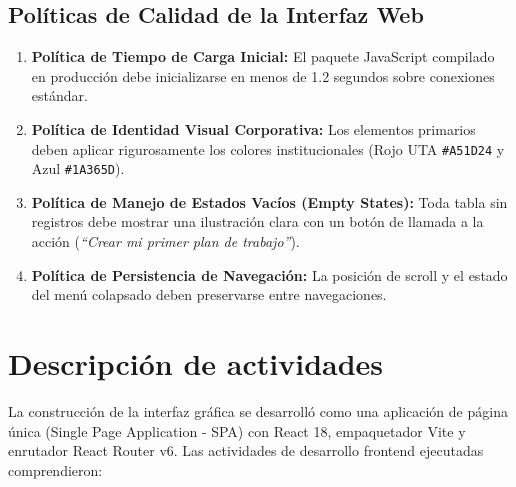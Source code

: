 \documentclass[12pt,a4paper]{article}
\begin{document}
\subsection{Políticas de Calidad de la Interfaz Web}
\begin{enumerate}[leftmargin=1.5em, itemsep=2pt]
    \item \textbf{Política de Tiempo de Carga Inicial:} El paquete JavaScript compilado en producción debe inicializarse en menos de 1.2 segundos sobre conexiones estándar.
    \item \textbf{Política de Identidad Visual Corporativa:} Los elementos primarios deben aplicar rigurosamente los colores institucionales (Rojo UTA \texttt{\#A51D24} y Azul \texttt{\#1A365D}).
    \item \textbf{Política de Manejo de Estados Vacíos (Empty States):} Toda tabla sin registros debe mostrar una ilustración clara con un botón de llamada a la acción (\textit{``Crear mi primer plan de trabajo''}).
    \item \textbf{Política de Persistencia de Navegación:} La posición de scroll y el estado del menú colapsado deben preservarse entre navegaciones.
\end{enumerate}

\section{Descripción de actividades}
La construcción de la interfaz gráfica se desarrolló como una aplicación de página única (Single Page Application - SPA) con React 18, empaquetador Vite y enrutador React Router v6. Las actividades de desarrollo frontend ejecutadas comprendieron:
\end{document}

